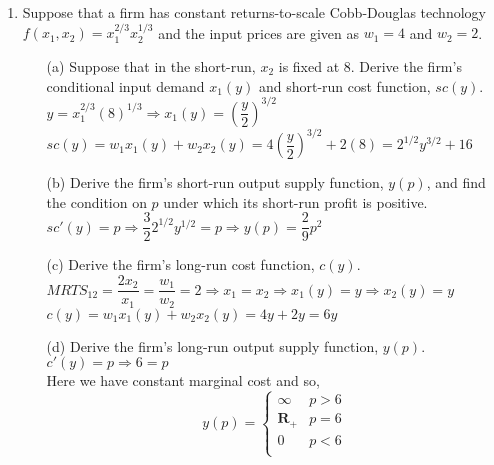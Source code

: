\documentclass[11pt]{article}
\begin{document}
\begin{enumerate}
\item Suppose that a firm has constant returns-to-scale Cobb-Douglas technology $f(x_{1},x_{2})=x_{1}^{2/3}x_{2}^{1/3}$ and the input prices are given as $w_{1}=4$ and $w_{2}=2$.
    \begin{itemize}
    \item[(a)] Suppose that in the short-run, $x_{2}$ is fixed at $8$. Derive the firm's conditional input demand $x_{1}(y)$ and short-run cost function, $sc(y)$.
    \medskip\\
    $y=x_1^{2/3}(8)^{1/3}\Rightarrow x_1(y)=(\dfrac{y}{2})^{3/2}$\\
    $sc(y)=w_1x_1(y)+w_2x_2(y)=4(\dfrac{y}{2})^{3/2}+2(8)=2^{1/2}y^{3/2}+16$
    \item[(b)] Derive the firm's short-run output supply function, $y(p)$, and find the condition on $p$ under which its short-run profit is positive.
    \medskip\\
    $sc'(y)=p\Rightarrow\dfrac{3}{2}2^{1/2}y^{1/2}=p\Rightarrow y(p)=\dfrac{2}{9}p^2$
    \item[(c)] Derive the firm's long-run cost function, $c(y)$.
    \medskip\\
    $MRTS_{12}=\dfrac{2x_2}{x_1}=\dfrac{w_1}{w_2}=2\Rightarrow x_1=x_2\Rightarrow x_1(y)=y\Rightarrow x_2(y)=y$\\
    $c(y)=w_1x_1(y)+w_2x_2(y)=4y+2y=6y$\\
    \item[(d)] Derive the firm's long-run output supply function, $y(p)$.
    \medskip\\
    $c'(y)=p\Rightarrow6=p$\\
    Here we have constant marginal cost and so,
    \begin{equation*}
            y(p)=\begin{cases}
            \infty & p>6\\
            \mathbf{R}_+ & p=6\\
            0 & p<6\\
            \end{cases}
        \end{equation*}
    \end{itemize}
\end{enumerate}
\end{document}
